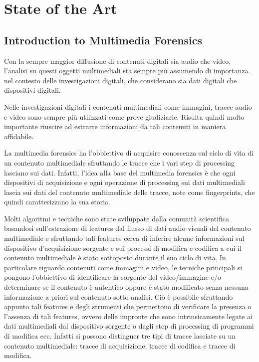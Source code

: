 \chapter{State of the Art}

\section{Introduction to Multimedia Forensics}

Con la sempre maggior diffusione di contenuti digitali sia audio che video, l'analisi su questi oggetti multimediali sta sempre più assumendo di importanza nel contesto delle investigazioni digitali, che considerano sia dati digitali che dispositivi digitali.

Nelle investigazioni digitali i contenuti multimediali come immagini, tracce audio e video sono sempre più utilizzati come prove giudiziarie. Risulta quindi molto importante riuscire ad estrarre informazioni da tali contenuti in maniera affidabile.

La multimedia forensics ha l'obbiettivo di acquisire conoscenza sul ciclo di vita di un contenuto multimediale sfruttando le tracce che i vari step di processing lasciano sui dati. Infatti, l'idea alla base del multimedia forensics è che ogni dispositivi di acquisizione e ogni operazione di processing sui dati multimediali lascia sui dati del contenuto multimediale delle tracce, note come fingerprints, che quindi caratterizzano la sua storia.

Molti algoritmi e tecniche sono state sviluppate dalla comunità scientifica basandosi sull'estrazione di features dal flusso di dati audio-visuali del contenuto multimediale e sfruttando tali features cerca di inferire alcune informazioni sul dispositivo d'acquisizione sorgente e sui processi di modifica e codifica a cui il contenuto multimediale è stato sottoposto durante il suo ciclo di vita. In particolare riguardo contenuti come immagini e video, le tecniche principali si pongono l'obbiettivo di identificare la sorgente del video/immagine e/o determinare se il contenuto è autentico oppure è stato modificato senza nessuna informazione a priori sul contenuto sotto analisi. Ciò è possibile sfruttando appunto tali features e degli strumenti che permettono di verificare la presenza o l'assenza di tali features, ovvero delle impronte che sono intrinsicamente legate ai dati multimediali dal dispositivo sorgente o dagli step di processing di programmi di modifica ecc. Infatti si possono distinguer tre tipi di tracce lasciate su un contenuto multimediale: tracce di acquisizione, tracce di codifica e tracce di modifica.

